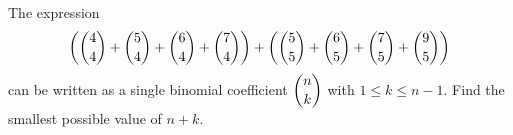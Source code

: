 The expression
\[\left(\dbinom44+\dbinom54+\dbinom64+\dbinom74\right)+\left(\dbinom55+\dbinom65+\dbinom75+\dbinom95\right)\]
can be written as a single binomial coefficient $\dbinom nk$ with $1\le k\le n-1$. Find the smallest possible value of $n+k$.
